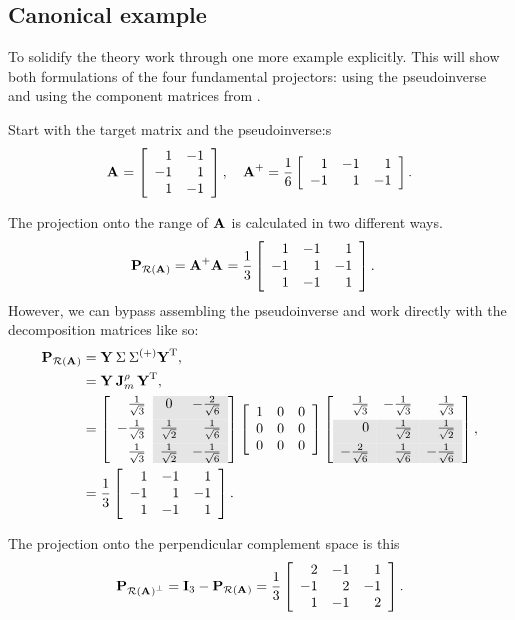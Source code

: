 \subsection{Canonical example}
To solidify the theory work through one more example explicitly. This will show both formulations of the four fundamental projectors: using the pseudoinverse and using the component matrices from \svdl.

Start with the target matrix and the pseudoinverse:s 
\begin{equation}
  \A{} = \Aexample, \quad \Ap = \Aexamplepi.
\end{equation}

The projection onto the range of $\A{}$ is calculated in two different ways.
\begin{equation}
\begin{split}
  \projra &= \leftinv = \rthree
    \mat{rrr}
    { 
    1 & -1 &  1\\
   -1 &  1 & -1\\
    1 & -1 &  1\\
    }.
\end{split}
\end{equation}
However, we can bypass assembling the pseudoinverse and work directly with the decomposition matrices like so:
\begin{equation}
\begin{split}
  \projra &= \Y{}\,\sig{}\,\sig{(+)}\Y{T},\\
    & = \Y{}\,\J{m}{\rho}\,\Y{T},\\
    &= \Yshade \mat{ccc}{1&0&0\\0&0&0\\0&0&0} \Ytshade,\\
    &= \rthree
    \mat{rrr}
    { 
    1 & -1 &  1\\
   -1 &  1 & -1\\
    1 & -1 &  1\\
    }.
\end{split}
\end{equation}

The projection onto the perpendicular complement space  is this
\begin{equation}
  \projrap = \I{3} - \projra = \rthree
    \mat{rrr}
    { 2 & -1 &  1\\
     -1 &  2 & -1\\
      1 & -1 &  2}.
\end{equation}

